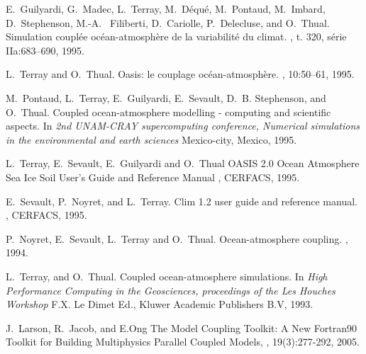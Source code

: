 \begin{thebibliography}{10}
E.~Guilyardi, G.~Madec, L.~Terray, M.~D\'equ\'e, M.~Pontaud, M.~Imbard, D.~Stephenson, M.-A. ~Filiberti, D.~Cariolle, P.~Delecluse, and O.~Thual. 
\newblock Simulation coupl\'ee oc\'ean-atmosph\`ere de la variabilit\'e du climat.
, t. 320, s\'erie IIa:683--690, 1995. 

L.~Terray and O.~Thual.
\newblock Oasis: le couplage oc\'ean-atmosph\`ere.
, 10:50--61, 1995.

M.~Pontaud, L.~Terray, E.~Guilyardi, E.~Sevault, D.~B. Stephenson, and
  O.~Thual.
\newblock Coupled ocean-atmosphere modelling - computing and scientific
  aspects.
\newblock In {\em 2nd UNAM-CRAY supercomputing conference, Numerical
  simulations in the environmental and earth sciences}
\newblock Mexico-city, Mexico, 1995.

L.~Terray, E.~Sevault, E.~Guilyardi and O.~Thual
\newblock OASIS 2.0 Ocean Atmosphere Sea Ice Soil User's Guide and Reference Manual
, CERFACS, 1995.

E.~Sevault, P.~Noyret, and L.~Terray.
\newblock Clim 1.2 user guide and reference manual.
, CERFACS, 1995.

P.~Noyret, E.~Sevault, L.~Terray and O.~Thual.
\newblock Ocean-atmosphere coupling. 
,
1994.

L.~Terray, and O.~Thual.
\newblock Coupled ocean-atmosphere simulations. 
\newblock In {\em High Performance Computing in the Geosciences,
proceedings of the Les Houches Workshop}
\newblock F.X. Le Dimet Ed., Kluwer Academic Publishers B.V, 1993.

J.~Larson, R.~Jacob, and E.Ong
\newblock The Model Coupling Toolkit: A New Fortran90 Toolkit for Building Multiphysics Parallel Coupled Models,
, 19(3):277-292, 2005.




\end{thebibliography}
